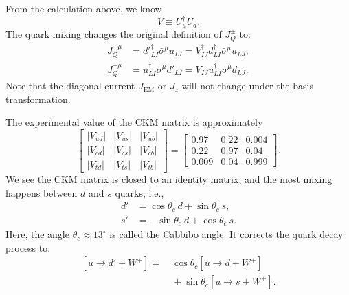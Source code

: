 \documentclass[aps,rmp,twocolumn,superscriptaddress,nofootinbib]{revtex4-2}
\begin{document}
From the calculation above, we know
\begin{equation}
	V \equiv U^\dagger_u U_d.
\end{equation}
The quark mixing changes the original definition of $J^\pm_Q$ to:
\begin{equation}
\begin{aligned}
	J^{+\mu}_Q &= {d'}_{LI}^{\dagger} \bar\sigma^\mu u_{LI}
		= V^\dagger_{IJ} d_{LI}^\dagger \bar\sigma^\mu u_{LJ}, \\
	J^{-\mu}_Q &= u_{LI}^\dagger \bar\sigma^\mu d'_{LI}
		= V_{IJ} u_{LI}^\dagger \bar\sigma^\mu d_{LJ}.
\end{aligned}
\end{equation}
Note that the diagonal current $J_{\mathrm{EM}}$ or $J_z$ will not change under the basis transformation.

The experimental value of the CKM matrix is approximately
\begin{equation}
	\begin{bmatrix}
		\left|V_{u d}\right| & \left|V_{u s}\right| & \left|V_{u b}\right| \\
		\left|V_{c d}\right| & \left|V_{c s}\right| & \left|V_{c b}\right| \\
		\left|V_{t d}\right| & \left|V_{t s}\right| & \left|V_{t b}\right|
	\end{bmatrix} =
	\begin{bmatrix}
		0.97 & 0.22 & 0.004 \\
		0.22 & 0.97 & 0.04 \\
		0.009 & 0.04 & 0.999
	\end{bmatrix}.
\end{equation}
We see the CKM matrix is closed to an identity matrix, and the most mixing happens between $d$ and $s$ quarks, i.e.,
\begin{equation}
\begin{aligned}
	d' &= \cos\theta_c\ d + \sin\theta_c\ s, \\
	s' &= -\sin\theta_c\ d + \cos\theta_c\ s.
\end{aligned}
\end{equation}
Here, the angle $\theta_c \approx 13^{\circ}$ is called the Cabbibo angle.
It corrects the quark decay process to:
\begin{equation}
\begin{aligned}
	\left[u \rightarrow d' + W^+\right]
	=&\ \cos\theta_c \left[u \rightarrow d + W^+\right] \\
	&\ + \sin\theta_c \left[u \rightarrow s + W^+\right].
\end{aligned}
\end{equation}
\end{document}
